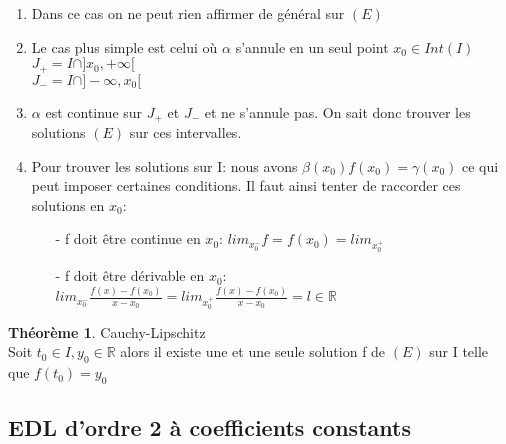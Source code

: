 \documentclass[fleqn]{article}
\theoremstyle{definition} \newtheorem*{defi}{D\'efinition}
\theoremstyle{definition} \newtheorem*{theo}{Th\'eor\`eme}
\theoremstyle{remark} \newtheorem*{rqs}{Remarques}
\begin{document}
\begin{enumerate}
\begin{enumerate}
			\item Dans ce cas on ne peut rien affirmer de g\'en\'eral sur $(E)$
			\item Le cas plus simple est celui o\`u $\alpha$ s'annule en un seul point $x_0 \in Int(I)$\\
				$J_+ = I \cap ]x_0, +\infty[$\\
				$J_- = I \cap ]-\infty, x_0[$
			\item $\alpha$ est continue sur $J_+$ et $J_-$ et ne s'annule pas. On sait donc trouver les solutions $(E)$ sur ces intervalles.
			\item Pour trouver les solutions sur I: nous avons $\beta(x_0)f(x_0) = \gamma(x_0)$ ce qui peut imposer certaines conditions.
				Il faut ainsi tenter de raccorder ces solutions en $x_0$:
				\begin{itemize}
					\item [-] f doit \^etre continue en $x_0$: $lim_{x_0^-} f = f(x_0) = lim_{x_0^+}$
					\item [-] f doit \^etre d\'erivable en $x_0$: $lim_{x_0^-} \frac{f(x) - f(x_0)}{x - x_0} = lim_{x_0^+} \frac{f(x) -
						f(x_0)}{x - x_0} = l \in \mathbb{R}$
				\end{itemize}
		\end{enumerate}
\end{enumerate}

\begin{theo} Cauchy-Lipschitz\\
	Soit $t_0 \in I, y_0 \in \mathbb{R}$ alors il existe une et une seule solution f de $(E)$ sur I telle que $f(t_0) = y_0$
\end{theo}

\subsection{EDL d'ordre 2 \`a coefficients constants}
\end{document}
